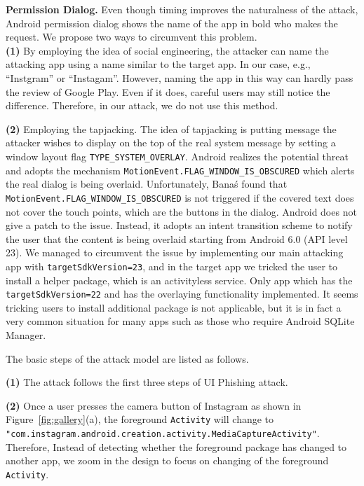 \documentclass[letterpaper,12pt]{article}
\begin{document}
\noindent\textbf{Permission Dialog.}
Even though timing improves the naturalness of the attack, Android
permission dialog shows the name of the app in bold who makes the
request. We propose two ways to circumvent this
problem.
\\\textbf{(1)} By employing the idea of social engineering, the attacker can name the attacking app 
using a name similar to the target app. In our case,
e.g., ``Instgram'' or ``Instagam''. However, naming the app in this way
can hardly pass the review of Google Play. Even if it does, careful
users may still notice the difference. Therefore, in our attack, we do not
use this method.

\noindent \textbf{(2)} Employing the tapjacking. The idea of tapjacking
is putting message the attacker wishes to display on the top of the
real system message by setting a window layout flag
\texttt{TYPE\_SYSTEM\_OVERLAY}. Android realizes the potential threat
and adopts the mechanism
\texttt{MotionEvent.FLAG\_WINDOW\_IS\_OBSCURED} which alerts the real
dialog is being overlaid\cite{flagwindowobscured}. Unfortunately,
Bana\'s\cite{TapjackingIwo} found that \\
\texttt{MotionEvent.FLAG\_WINDOW\_IS\_OBSCURED} is not triggered if
the covered text does not cover the touch points, which are the
buttons in the dialog. Android does not give a patch to the issue.
Instead, it adopts an intent transition scheme to notify the user that
the content is being overlaid starting from Android 6.0 (API level
23). We managed to circumvent the issue by implementing our main
attacking app with \texttt{targetSdkVersion=23}, and in the target app
we tricked the user to install a helper package, which is an
activityless service.  Only app which has the
\texttt{targetSdkVersion=22} and has the overlaying functionality
implemented. It seems tricking users to install additional package is
not applicable, but it is in fact a very common situation for many
apps such as those who require Android SQLite Manager.

The basic steps of the attack model are listed as
follows.

\textbf{(1)} The attack follows the first three steps of UI Phishing
attack.

\textbf{(2)} Once a user presses the camera button of Instagram as
shown in Figure~\ref{fig:gallery}(a), the foreground \texttt{Activity}
will change to
\texttt{"com.instagram.android.creation.activity.\-MediaCaptureActivity"}. Therefore,
Instead of detecting whether the foreground package has changed to
another app, we zoom in the design to focus on changing of the
foreground \texttt{Activity}.
\end{document}
